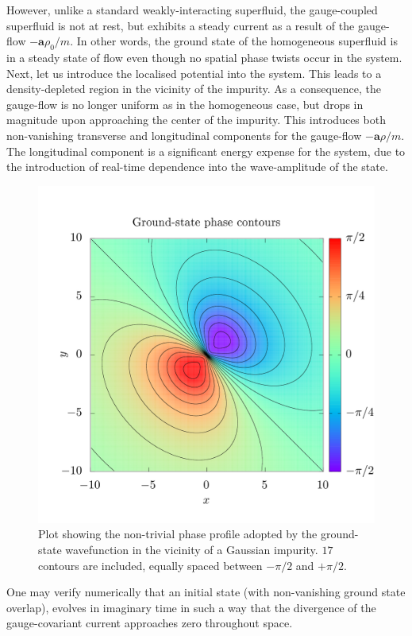 \documentclass[twocolumn, nofootinbib, nobibnotes, amsmath,amssymb,aps, pra, floatfix]{revtex4-1}
\renewcommand{\v}[1]{\ensuremath{\mathbf{#1}}} %
\begin{document}
However, unlike a standard weakly-interacting superfluid, the gauge-coupled superfluid is not at rest, but exhibits a steady current as a result of the gauge-flow $-\v{a}\rho_0/m$.
In other words, the ground state of the homogeneous superfluid is in a steady state of flow even though no spatial phase twists occur in the system.
Next, let us introduce the localised potential into the system.
This leads to a density-depleted region in the vicinity of the impurity.
As a consequence, the gauge-flow is no longer uniform as in the homogeneous case, but drops in magnitude upon approaching the center of the impurity.
This introduces both non-vanishing transverse and longitudinal components for the gauge-flow $-\v{a}\rho/m$.
The longitudinal component is a significant energy expense for the system, due to the introduction of real-time dependence into the wave-amplitude of the state.
\begin{figure}[h]
  \centering
  \includegraphics[width=\columnwidth]{./GroundState_a1PhaseContours-1.png}
  \caption{Plot showing the non-trivial phase profile adopted by the ground-state wavefunction in the vicinity of a Gaussian impurity. $17$ contours are included, equally spaced between $-\pi/2$ and $+\pi/2$.}
  \label{fig:GroundStatePhaseContours}
\end{figure}
One may verify numerically that an initial state (with non-vanishing ground state overlap), evolves in imaginary time in such a way that the divergence of the gauge-covariant current approaches zero throughout space.
\end{document}
